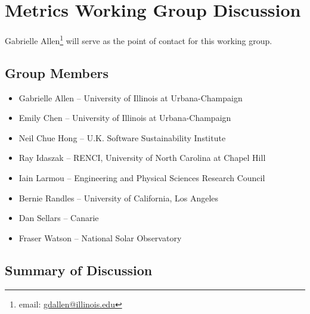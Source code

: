 \section{Metrics Working Group Discussion}
\label{sec:appendix_metrics}

Gabrielle Allen\footnote{email: \href{mailto:gdallen@illinois.edu}{gdallen@illinois.edu}} 
will serve as the point of contact for this working group.


\subsection{Group Members}

\begin{itemize}
\item Gabrielle Allen -- University of Illinois at Urbana-Champaign
\item Emily Chen -- University of Illinois at Urbana-Champaign
\item Neil Chue Hong -- U.K. Software Sustainability Institute
\item Ray Idaszak -- RENCI, University of North Carolina at Chapel Hill
\item Iain Larmou -- Engineering and Physical Sciences Research Council
\item Bernie Randles -- University of California, Los Angeles
\item Dan Sellars -- Canarie
\item Fraser Watson -- National Solar Observatory
\end{itemize}

\subsection{Summary of Discussion}

